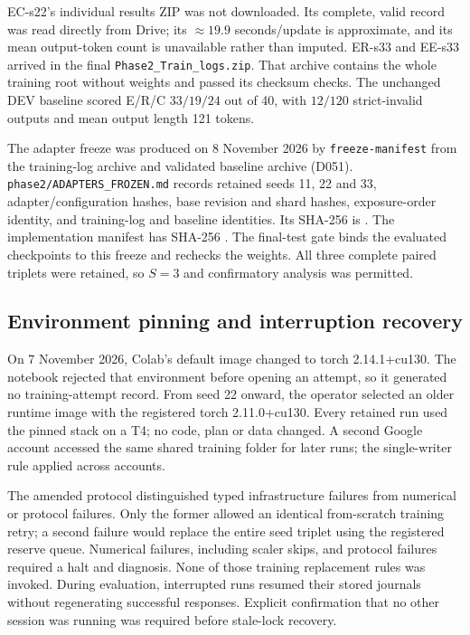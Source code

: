 EC-s22's individual results ZIP was not downloaded. Its complete, valid record was read directly from Drive; its $\approx19.9$ seconds/update is approximate, and its mean output-token count is unavailable rather than imputed. ER-s33 and EE-s33 arrived in the final \texttt{Phase2\_Train\_logs.zip}. That archive contains the whole training root without weights and passed its checksum checks. The unchanged DEV baseline scored E/R/C $33/19/24$ out of 40, with $12/120$ strict-invalid outputs and mean output length 121 tokens.

The adapter freeze was produced on 8 November 2026 by \texttt{freeze-manifest} from the training-log archive and validated baseline archive (D051). \nolinkurl{phase2/ADAPTERS_FROZEN.md} records retained seeds 11, 22 and 33, adapter/configuration hashes, base revision and shard hashes, exposure-order identity, and training-log and baseline identities. Its SHA-256 is . The implementation manifest has SHA-256 . The final-test gate binds the evaluated checkpoints to this freeze and rechecks the weights. All three complete paired triplets were retained, so $S=3$ and confirmatory analysis was permitted.

\subsection{Environment pinning and interruption recovery}
On 7 November 2026, Colab's default image changed to torch 2.14.1+cu130. The notebook rejected that environment before opening an attempt, so it generated no training-attempt record. From seed 22 onward, the operator selected an older runtime image with the registered torch 2.11.0+cu130. Every retained run used the pinned stack on a T4; no code, plan or data changed. A second Google account accessed the same shared training folder for later runs; the single-writer rule applied across accounts.

The amended protocol distinguished typed infrastructure failures from numerical or protocol failures. Only the former allowed an identical from-scratch training retry; a second failure would replace the entire seed triplet using the registered reserve queue. Numerical failures, including scaler skips, and protocol failures required a halt and diagnosis. None of those training replacement rules was invoked. During evaluation, interrupted runs resumed their stored journals without regenerating successful responses. Explicit confirmation that no other session was running was required before stale-lock recovery.

